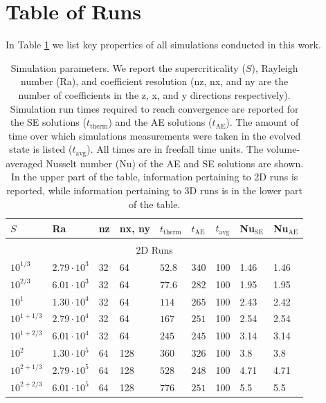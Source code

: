 \documentclass[aps, pre, onecolumn, nofootinbib, notitlepage, groupedaddress, amsfonts, amssymb, amsmath, longbibliography]{revtex4-1}
\begin{document}
\section{Table of Runs}
\label{appendix:run_table}
In Table \ref{table:run_parameters} we list key properties of all simulations
conducted in this work.  
\begin{table}
\caption{Simulation parameters. We report the supercriticality ($S$), Rayleigh number (Ra), 
and coefficient resolution (nz, nx, and ny are the number of coefficients in the
z, x, and y directions respectively).
Simulation run times required to reach convergence
are reported for the SE solutions ($t_{\text{therm}}$) and the AE solutions ($t_{\text{AE}}$).
The amount of time over which simulations measurements were taken in the evolved
state is listed ($t_{\text{avg}}$). All times are in freefall time units.  
The volume-averaged Nusselt number (Nu) of the
AE and SE solutions are shown.
In the upper part of the table, information pertaining to 2D runs is reported,
while information pertaining to 3D runs is in the lower part of the table.
}
\label{table:run_parameters}
\begin{center}
\begin{tabularx}{\textwidth}{ X X X X | X X X | X X }
\hline																	
$S$	&	Ra	&	nz	&	nx, ny	&	$t_{\text{therm}}$	&	$t_{\text{AE}}$	&	$t_{\text{avg}}$	&	Nu$_{\text{SE}}$	&	Nu$_{\text{AE}}$	\\
\hline \hline \multicolumn{9}{c}{\vspace{-0.2cm}}\\
\multicolumn{9}{c}{\vspace{0.1cm}2D Runs} \\
\hline
$10^{1/3}$	&	$2.79 \cdot 10^3$	&	32	&	64	&	$52.8$	&	$340$	&	100	&	1.46	&	1.46	\\
$10^{2/3}$	&	$6.01 \cdot 10^3$	&	32	&	64	&	$77.6$	&	$282$	&	100	&	1.95	&	1.95	\\
$10^1$	&	$1.30 \cdot 10^4$	&	32	&	64	&	$114$	&	$265$	&	100	&	2.43	&	2.42	\\
$10^{1 + 1/3}$	&	$2.79 \cdot 10^4$	&	32	&	64	&	$167$	&	$251$	&	100	&	2.54	&	2.54	\\
$10^{1 + 2/3}$	&	$6.01 \cdot 10^4$	&	32	&	64	&	$245$	&	$245$	&	100	&	3.14	&	3.14	\\
$10^2$	&	$1.30 \cdot 10^5$	&	64	&	128	&	$360$	&	$326$	&	100	&	3.8	&	3.8	\\
$10^{2 + 1/3}$	&	$2.79 \cdot 10^5$	&	64	&	128	&	$528$	&	$248$	&	100	&	4.71	&	4.71	\\
$10^{2 + 2/3}$	&	$6.01 \cdot 10^5$	&	64	&	128	&	$776$	&	$251$	&	100	&	5.5	&	5.5	\\

\end{tabularx}
\end{center}
\end{table}
\end{document}
